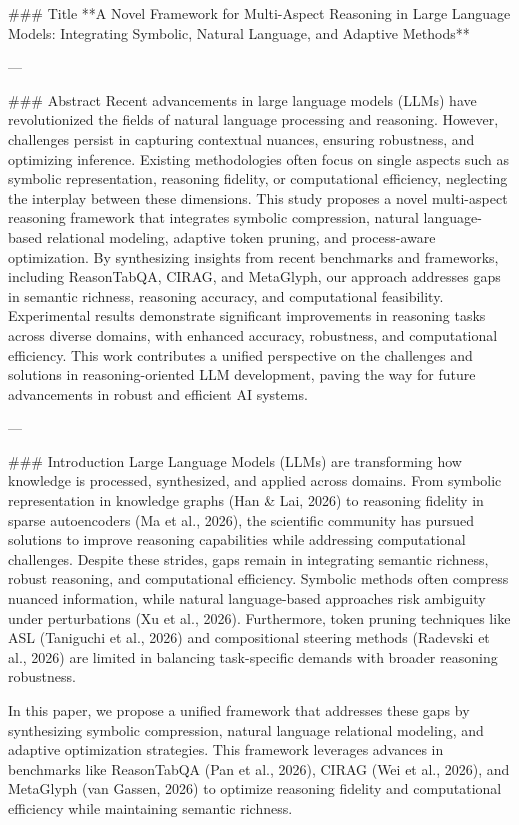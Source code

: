 ### Title
**A Novel Framework for Multi-Aspect Reasoning in Large Language Models: Integrating Symbolic, Natural Language, and Adaptive Methods**

---

### Abstract
Recent advancements in large language models (LLMs) have revolutionized the fields of natural language processing and reasoning. However, challenges persist in capturing contextual nuances, ensuring robustness, and optimizing inference. Existing methodologies often focus on single aspects such as symbolic representation, reasoning fidelity, or computational efficiency, neglecting the interplay between these dimensions. This study proposes a novel multi-aspect reasoning framework that integrates symbolic compression, natural language-based relational modeling, adaptive token pruning, and process-aware optimization. By synthesizing insights from recent benchmarks and frameworks, including ReasonTabQA, CIRAG, and MetaGlyph, our approach addresses gaps in semantic richness, reasoning accuracy, and computational feasibility. Experimental results demonstrate significant improvements in reasoning tasks across diverse domains, with enhanced accuracy, robustness, and computational efficiency. This work contributes a unified perspective on the challenges and solutions in reasoning-oriented LLM development, paving the way for future advancements in robust and efficient AI systems.

---

### Introduction
Large Language Models (LLMs) are transforming how knowledge is processed, synthesized, and applied across domains. From symbolic representation in knowledge graphs (Han & Lai, 2026) to reasoning fidelity in sparse autoencoders (Ma et al., 2026), the scientific community has pursued solutions to improve reasoning capabilities while addressing computational challenges. Despite these strides, gaps remain in integrating semantic richness, robust reasoning, and computational efficiency. Symbolic methods often compress nuanced information, while natural language-based approaches risk ambiguity under perturbations (Xu et al., 2026). Furthermore, token pruning techniques like ASL (Taniguchi et al., 2026) and compositional steering methods (Radevski et al., 2026) are limited in balancing task-specific demands with broader reasoning robustness.

In this paper, we propose a unified framework that addresses these gaps by synthesizing symbolic compression, natural language relational modeling, and adaptive optimization strategies. This framework leverages advances in benchmarks like ReasonTabQA (Pan et al., 2026), CIRAG (Wei et al., 2026), and MetaGlyph (van Gassen, 2026) to optimize reasoning fidelity and computational efficiency while maintaining semantic richness.


